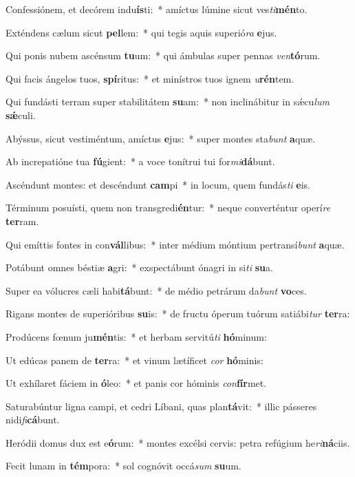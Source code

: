 \item Confessiónem, et decórem indu\textbf{ís}ti:~* amíctus lúmine sicut ves\textit{ti}\textbf{mén}to.
\item Exténdens cælum sicut \textbf{pel}lem:~* qui tegis aquis superió\textit{ra} \textbf{e}jus.
\item Qui ponis nubem ascénsum \textbf{tu}um:~* qui ámbulas super pennas \textit{ven}\textbf{tó}rum.
\item Qui facis ángelos tuos, \textbf{spí}ritus:~* et minístros tuos ignem \textit{u}\textbf{rén}tem.
\item Qui fundásti terram super stabilitátem \textbf{su}am:~* non inclinábitur in sǽcu\textit{lum} \textbf{sǽ}culi.
\item Abýssus, sicut vestiméntum, amíctus \textbf{e}jus:~* super montes sta\textit{bunt} \textbf{a}quæ.
\item Ab increpatióne tua \textbf{fú}gient:~* a voce tonítrui tui for\textit{mi}\textbf{dá}bunt.
\item Ascéndunt montes: et descéndunt \textbf{cam}pi~* in locum, quem fundás\textit{ti} \textbf{e}is.
\item Términum posuísti, quem non transgredi\textbf{én}tur:~* neque converténtur operí\textit{re} \textbf{ter}ram.
\item Qui emíttis fontes in con\textbf{vál}libus:~* inter médium móntium pertransí\textit{bunt} \textbf{a}quæ.
\item Potábunt omnes béstiæ \textbf{a}gri:~* exspectábunt ónagri in si\textit{ti} \textbf{su}a.
\item Super ea vólucres cæli habi\textbf{tá}bunt:~* de médio petrárum da\textit{bunt} \textbf{vo}ces.
\item Rigans montes de superióribus \textbf{su}is:~* de fructu óperum tuórum satiábi\textit{tur} \textbf{ter}ra:
\item Prodúcens fœnum ju\textbf{mén}tis:~* et herbam servitú\textit{ti} \textbf{hó}minum:
\item Ut edúcas panem de \textbf{ter}ra:~* et vinum lætíficet \textit{cor} \textbf{hó}minis:
\item Ut exhílaret fáciem in \textbf{ó}leo:~* et panis cor hóminis \textit{con}\textbf{fír}met.
\item Saturabúntur ligna campi, et cedri Líbani, quas plan\textbf{tá}vit:~* illic pásseres nidi\textit{fi}\textbf{cá}bunt.
\item Heródii domus dux est e\textbf{ó}rum:~* montes excélsi cervis: petra refúgium he\textit{ri}\textbf{ná}ciis.
\item Fecit lunam in \textbf{tém}pora:~* sol cognóvit occá\textit{sum} \textbf{su}um.
